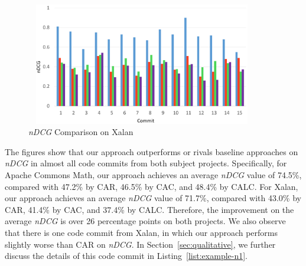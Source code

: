 \begin{figure}
\centering
		
		\includegraphics[width=4in, height=2.1in]{performance/images/xalan-dcg.pdf}
			
		\caption{\textit{nDCG} Comparison on Xalan}	
		\label{fig:xalan-dcg}
\end{figure}


%

The figures show that our approach outperforms or rivals baseline approaches on \textit{nDCG} in almost all code commits from both subject projects. Specifically, for Apache Commons Math, our approach achieves an average \textit{nDCG} value of 74.5\%, compared with 47.2\% by CAR, 46.5\% by CAC, and 48.4\% by CALC. For Xalan, our approach achieves an average \textit{nDCG} value of 71.7\%, compared with 43.0\% by CAR, 41.4\% by CAC, and 37.4\% by CALC. Therefore, the improvement on the average \textit{nDCG} is over 26 percentage points on both projects. We also observe that there is one code commit from Xalan, in which our approach performs slightly worse than CAR on \textit{nDCG}. In Section~\ref{sec:qualitative}, we further discuss the details of this code commit in Listing~\ref{list:example-n1}.

